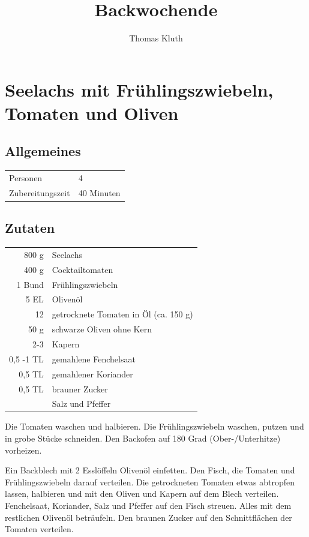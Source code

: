 \documentclass[10pt,a4paper,ngerman, DIV=16]{scrartcl}
\author{Thomas Kluth}
\title{Backwochende}
\begin{document}
\maketitle
\tableofcontents

\section{Seelachs mit Frühlingszwiebeln, Tomaten und Oliven}\label{sec:SeeLachs:TomatenOliven}
\subsection*{Allgemeines}
\begin{tabular}{ll}
    Personen         &  4   \\
    Zubereitungszeit & 40 Minuten  \\
\end{tabular} 
\subsection*{Zutaten}
\begin{tabular}{r l}
    800 g & Seelachs                              \\
    400 g & Cocktailtomaten                       \\
    1 Bund & Frühlingszwiebeln                     \\
    5 EL & Olivenöl                              \\
    12 & getrocknete Tomaten in Öl (ca. 150 g) \\
    50 g & schwarze Oliven ohne Kern             \\
    2-3 & Kapern                                \\
    0,5 -1 TL & gemahlene Fenchelsaat                 \\
    0,5 TL & gemahlener Koriander                  \\
    0,5 TL & brauner Zucker                        \\
    & Salz und Pfeffer
\end{tabular}

Die Tomaten waschen und halbieren. Die Frühlingszwiebeln waschen, putzen und in grobe Stücke schneiden. Den Backofen auf 180 Grad (Ober-/Unterhitze) vorheizen.

Ein Backblech mit 2 Esslöffeln Olivenöl einfetten. Den Fisch, die Tomaten und Frühlingszwiebeln darauf verteilen. Die getrockneten Tomaten etwas abtropfen lassen, halbieren und mit den Oliven und Kapern auf dem Blech verteilen. Fenchelsaat, Koriander, Salz und Pfeffer auf den Fisch streuen. Alles mit dem restlichen Olivenöl beträufeln. Den braunen Zucker auf den Schnittflächen der Tomaten verteilen.
\end{document}
